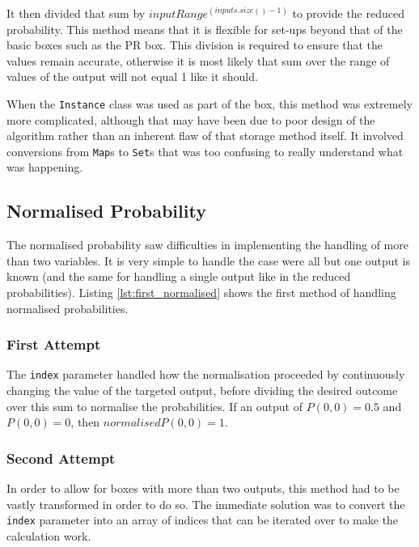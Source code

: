 \documentclass[report.tex]{subfiles}
\begin{document}
It then divided that sum by \(inputRange ^{(inputs.size() - 1)}\) to provide the
reduced probability. This method means that it is flexible for set-ups beyond
that of the basic boxes such as the PR box. This division is required to ensure
that the values remain accurate, otherwise it is most likely that sum over the
range of values of the output will not equal 1 like it should.

When the \texttt{Instance} class was used as part of the box, this method was
extremely more complicated, although that may have been due to poor design of
the algorithm rather than an inherent flaw of that storage method itself. It
involved conversions from \texttt{Map}s to \texttt{Set}s that was too confusing
to really understand what was happening.

\subsection{Normalised Probability} %
\label{sub:normalised_probability}
The normalised probability saw difficulties in implementing the handling of more
than two variables. It is very simple to handle the case were all but one output
is known (and the same for handling a single output like in the reduced
probabilities). Listing \ref{lst:first_normalised} shows the first method of
handling normalised probabilities.

\subsubsection{First Attempt} %
\label{ssub:first_attempt}
 

The \texttt{index} parameter handled how the normalisation proceeded by
continuously changing the value of the targeted output, before dividing the
desired outcome over this sum to normalise the probabilities. If an output of
\(P(0, 0) = 0.5\) and \(P(0, 0) = 0\), then \(normalisedP(0, 0) = 1\).

\subsubsection{Second Attempt} %
\label{ssub:second_attempt}
In order to allow for boxes with more than two outputs, this method had to be
vastly transformed in order to do so. The immediate solution was to convert the
\texttt{index} parameter into an array of indices that can be iterated over to
make the calculation work.
\end{document}
